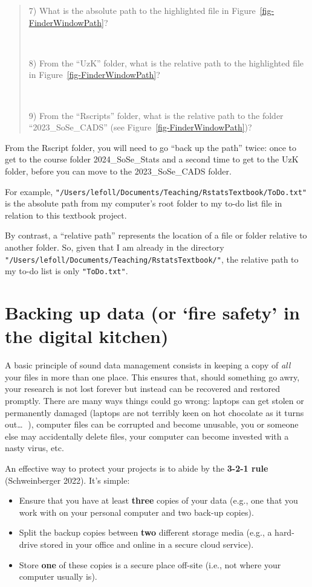 \documentclass[
  letterpaper,
  DIV=11,
  numbers=noendperiod]{scrreprt}
\providecommand{\tightlist}{%
  \setlength{\itemsep}{0pt}\setlength{\parskip}{0pt}}\usepackage{longtable,booktabs,array}
\begin{document}
\begin{quote}
7) What is the absolute path to the highlighted file in
Figure~\ref{fig-FinderWindowPath}?

~

8) From the ``UzK'' folder, what is the relative path to the highlighted
file in Figure~\ref{fig-FinderWindowPath}?

~

9) From the ``Rscripts'' folder, what is the relative path to the folder
``2023\_SoSe\_CADS'' (see Figure~\ref{fig-FinderWindowPath})?
\end{quote}

From the Rscript folder, you will need to go ``back up the path'' twice:
once to get to the course folder 2024\_SoSe\_Stats and a second time to
get to the UzK folder, before you can move to the 2023\_SoSe\_CADS
folder.

For example,
\texttt{"/Users/lefoll/Documents/Teaching/RstatsTextbook/ToDo.txt"} is
the absolute path from my computer's root folder to my to-do list file
in relation to this textbook project.

By contrast, a ``relative path'' represents the location of a file or
folder relative to another folder. So, given that I am already in the
directory \texttt{"/Users/lefoll/Documents/Teaching/RstatsTextbook/"},
the relative path to my to-do list is only \texttt{"ToDo.txt"}.

\section{Backing up data (or `fire safety' in the digital kitchen)
🧯}\label{backing-up-data-or-fire-safety-in-the-digital-kitchen}

A basic principle of sound data management consists in keeping a copy of
\emph{all} your files in more than one place. This ensures that, should
something go awry, your research is not lost forever but instead can be
recovered and restored promptly. There are many ways things could go
wrong: laptops can get stolen or permanently damaged (laptops are not
terribly keen on hot chocolate as it turns out\ldots{} 🙈), computer
files can be corrupted and become unusable, you or someone else may
accidentally delete files, your computer can become invested with a
nasty virus, etc.

An effective way to protect your projects is to abide by the
\textbf{3-2-1 rule} (Schweinberger 2022). It's simple:

\begin{itemize}
\tightlist
\item
  Ensure that you have at least \textbf{three} copies of your data
  (e.g., one that you work with on your personal computer and two
  back-up copies).
\item
  Split the backup copies between \textbf{two} different storage media
  (e.g., a hard-drive stored in your office and online in a secure cloud
  service).
\item
  Store \textbf{one} of these copies is a secure place off-site (i.e.,
  not where your computer usually is).
\end{itemize}
\end{document}
